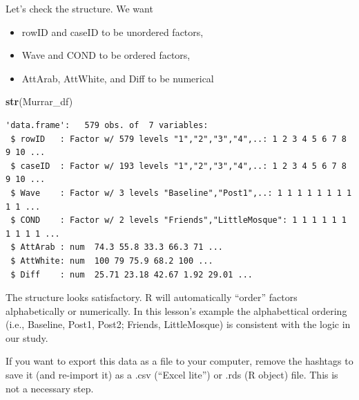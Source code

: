 \documentclass[
  11pt,
]{book}
\newenvironment{Shaded}{\begin{snugshade}}{\end{snugshade}}
\newcommand{\AttributeTok}[1]{\textcolor[rgb]{0.27,0.27,0.27}{#1}}
\newcommand{\CommentTok}[1]{\textcolor[rgb]{0.37,0.37,0.37}{\textit{#1}}}
\newcommand{\FunctionTok}[1]{\textcolor[rgb]{0.27,0.27,0.27}{\textbf{#1}}}
\newcommand{\NormalTok}[1]{#1}
\newcommand{\OtherTok}[1]{\textcolor[rgb]{0.37,0.37,0.37}{#1}}
\newcommand{\SpecialCharTok}[1]{\textcolor[rgb]{0.43,0.43,0.43}{\textbf{#1}}}
\newcommand{\StringTok}[1]{\textcolor[rgb]{0.5,0.5,0.5}{#1}}
\providecommand{\tightlist}{%
  \setlength{\itemsep}{0pt}\setlength{\parskip}{0pt}}
\begin{document}
\begin{Shaded}
\end{Shaded}

Let's check the structure. We want

\begin{itemize}
\tightlist
\item
  rowID and caseID to be unordered factors,
\item
  Wave and COND to be ordered factors,
\item
  AttArab, AttWhite, and Diff to be numerical
\end{itemize}

\begin{Shaded}
\begin{Highlighting}[]
\FunctionTok{str}\NormalTok{(Murrar\_df)}
\end{Highlighting}
\end{Shaded}

\begin{verbatim}
'data.frame':   579 obs. of  7 variables:
 $ rowID   : Factor w/ 579 levels "1","2","3","4",..: 1 2 3 4 5 6 7 8 9 10 ...
 $ caseID  : Factor w/ 193 levels "1","2","3","4",..: 1 2 3 4 5 6 7 8 9 10 ...
 $ Wave    : Factor w/ 3 levels "Baseline","Post1",..: 1 1 1 1 1 1 1 1 1 1 ...
 $ COND    : Factor w/ 2 levels "Friends","LittleMosque": 1 1 1 1 1 1 1 1 1 1 ...
 $ AttArab : num  74.3 55.8 33.3 66.3 71 ...
 $ AttWhite: num  100 79 75.9 68.2 100 ...
 $ Diff    : num  25.71 23.18 42.67 1.92 29.01 ...
\end{verbatim}

The structure looks satisfactory. R will automatically ``order'' factors alphabetically or numerically. In this lesson's example the alphabettical ordering (i.e., Baseline, Post1, Post2; Friends, LittleMosque) is consistent with the logic in our study.

If you want to export this data as a file to your computer, remove the hashtags to save it (and re-import it) as a .csv (``Excel lite'') or .rds (R object) file. This is not a necessary step.
\end{document}
